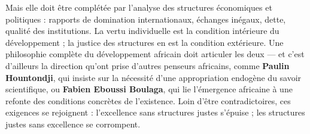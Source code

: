 \documentclass[11pt]{article}
\newcommand{\cle}[1]{{\popxbold\color{popdark}#1}}
\begin{document}
Mais elle doit être \cle{complétée} par l'analyse des structures économiques et politiques : rapports de domination internationaux, échanges inégaux, dette, qualité des institutions. La vertu individuelle est la condition intérieure du développement ; la justice des structures en est la condition extérieure. Une philosophie complète du développement africain doit articuler les deux — et c'est d'ailleurs la direction qu'ont prise d'autres penseurs africains, comme \textbf{Paulin Hountondji}, qui insiste sur la nécessité d'une appropriation endogène du savoir scientifique, ou \textbf{Fabien Eboussi Boulaga}, qui lie l'émergence africaine à une refonte des conditions concrètes de l'existence. Loin d'être contradictoires, ces exigences se rejoignent : l'excellence sans structures justes s'épuise ; les structures justes sans excellence se corrompent.
\end{document}
